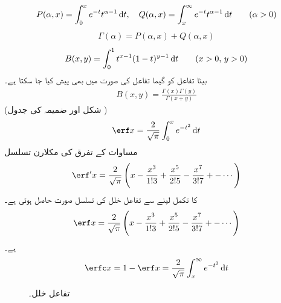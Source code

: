 \begin{align}
P(\alpha,x)=\int_{0}^{x} e^{-t}t^{\alpha-1}\dif t, \quad Q(\alpha,x)=\int_{x}^{\infty} e^{-t}t^{\alpha-1}\dif t \quad \quad (\alpha>0)
\end{align}
%
\begin{align}
\Gamma(\alpha)=P(\alpha,x)+Q(\alpha,x)
\end{align}
\begin{align}
B(x,y)=\int_{0}^{1}t^{x-1}(1-t)^{y-1}\dif t\quad \quad (x>0,\, y>0)
\end{align}
بیٹا تفاعل کو گیما تفاعل کی صورت میں بھی پیش کیا جا سکتا ہے۔
\begin{align}
B(x,y)=\frac{\Gamma(x) \Gamma(y)}{\Gamma(x+y)}
\end{align}
(شکل  اور ضمیمہ  کی جدول )
\begin{align}\label{مساوات_ضمیمہ_تفاعل_خلل_الف}
\erf x=\frac{2}{\sqrt{\pi}}\int_{0}^{x} e^{-t^2}\dif t
\end{align}
مساوات  کے تفرق  کی مکلارن تسلسل 
\begin{align*}
\erf' x=\frac{2}{\sqrt{\pi}}\left(x-\frac{x^3}{1!3}+\frac{x^5}{2!5}-\frac{x^7}{3!7}+-\cdots \right)
\end{align*}
 کا تکمل لینے سے تفاعل خلل کی تسلسل صورت حاصل ہوتی ہے۔
%
\begin{align}
\erf x=\frac{2}{\sqrt{\pi}}\left(x-\frac{x^3}{1!3}+\frac{x^5}{2!5}-\frac{x^7}{3!7}+-\cdots \right)
\end{align}
 ہے۔ 
\begin{align}
\erfc x=1-\erf x=\frac{2}{\sqrt{\pi}} \int_{x}^{\infty} e^{-t^2}\dif t
\end{align}
%
\begin{figure}
\centering
{}
\caption{تفاعل خلل۔}
\label{شکل_ضمیمہ_مفید_تفاعل_خلل}
\end{figure}
